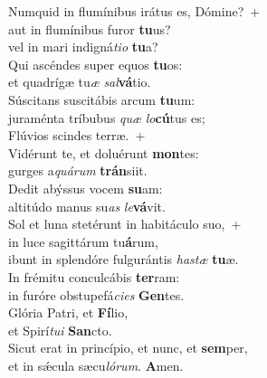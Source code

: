\evenverse Numquid in flumínibus irátus es, Dómine?~+\\\evenverse  aut in flumínibus furor \textbf{tu}us?~\*\\
\evenverse vel in mari indigná\textit{ti}\textit{o} \textbf{tu}a?\\
\oddverse Qui ascéndes super equos \textbf{tu}os:~\*\\
\oddverse et quadrígæ tu\textit{æ} \textit{sal}\textbf{vá}tio.\\
\evenverse Súscitans suscitábis arcum \textbf{tu}um:~\*\\
\evenverse juraménta tríbubus \textit{quæ} \textit{lo}\textbf{cú}tus es;\\
\oddverse Flúvios scindes terræ.~+\\
\oddverse  Vidérunt te, et doluérunt \textbf{mon}tes:~\*\\
\oddverse gurges a\textit{quá}\textit{rum} \textbf{trán}siit.\\
\evenverse Dedit abýssus vocem \textbf{su}am:~\*\\
\evenverse altitúdo manus su\textit{as} \textit{le}\textbf{vá}vit.\\
\oddverse Sol et luna stetérunt in habitáculo suo,~+\\
\oddverse  in luce sagittárum tu\textbf{á}rum,~\*\\
\oddverse ibunt in splendóre fulgurántis \textit{ha}\textit{stæ} \textbf{tu}æ.\\
\evenverse In frémitu conculcábis \textbf{ter}ram:~\*\\
\evenverse in furóre obstupefá\textit{ci}\textit{es} \textbf{Gen}tes.\\
\oddverse Glória Patri, et \textbf{Fí}lio,~\*\\
\oddverse et Spirí\textit{tu}\textit{i} \textbf{San}cto.\\
\evenverse Sicut erat in princípio, et nunc, et \textbf{sem}per,~\*\\
\evenverse et in sǽcula sæcu\textit{ló}\textit{rum}. \textbf{A}men.\\
